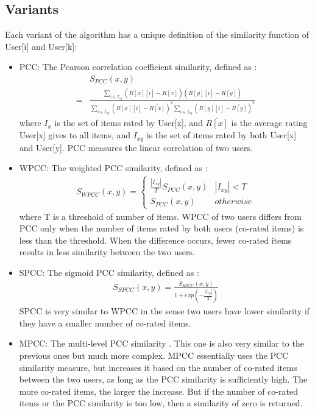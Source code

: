\documentclass[12pt]{WSUThesis}
\theoremstyle{definition}
\begin{document}
\subsection{Variants}
Each variant of the algorithm has a unique definition of the similarity 
function of User[i] and User[k]:
\begin{itemize}
	\item PCC: The Pearson correlation coefficient similarity, defined as 
	\cite{resnick1994grouplens}:
	\begin{align*}
	& S_{PCC}(x, y) \\
	=& \frac{\sum_{i \in I_{xy}}(R[x][i] - \overline{R[x]})(R[y][i] - 
		\overline{R[y]})}{\sum_{i \in I_{xy}}(R[x][i] - \overline{R[x]})^2 
		\sum_{i 
			\in I_{xy}}(R[y][i] - \overline{R[y]})^2 }
	\end{align*}
	where $ I_{x} $ is the set of items rated by User[x],
	and	$ \overline{R[x]} $ is the average rating User[x] gives to all items,
	and $ I_{xy} $ is the set of items rated by both User[x] and User[y].
	PCC measures the linear correlation of two users.
	\item WPCC: The weighted PCC similarity, defined as 
	\cite{herlocker1999algorithmic}:
	\begin{align*}
	S_{WPCC}(x, y)=
	\begin{cases}
	\frac{|I_{xy}|}{T} S_{PCC}(x, y) & |I_{xy}| < T \\
	S_{PCC}(x, y) & otherwise
	\end{cases}
	\end{align*}
	where T is a threshold of number of items. 
	WPCC of two users differs from PCC only when the number of items rated by 
	both users (co-rated items) is less than the threshold. 
	When the difference occurs, fewer co-rated items results in less similarity 
	between the two users.
	\item SPCC: The sigmoid PCC similarity, defined as 	
	\cite{jamali2009trustwalker}:
	\begin{align*}
	S_{SPCC} (x, y)
	= \frac{S_{SPCC}(x, y)}{1 + exp(-\frac{|I_{xy}|}{2})}
	\end{align*}
	SPCC is very similar to WPCC in the sense two users have lower similarity 
	if they have a smaller number of co-rated items.
	\item MPCC: The multi-level PCC similarity \cite{polatidis2016multi}. 
	This one is also very similar to the previous ones but much more complex.
	MPCC essentially uses the PCC similarity measure, but increases it 
	based on the number of co-rated items between the two users,
	as long as the PCC similarity is sufficiently high.
	The more co-rated items, the larger the increase.
	But if the number of co-rated items or the PCC similarity is too low,
	then a similarity of zero is returned.
\end{itemize}
\end{document}
